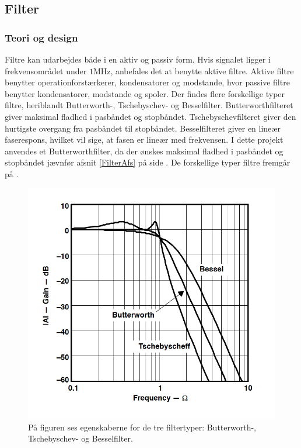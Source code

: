 \subsection{Filter}
\subsubsection{Teori og design}
Filtre kan udarbejdes både i en aktiv og passiv form. Hvis signalet ligger i frekvensområdet under $1$MHz, anbefales det at benytte aktive filtre. Aktive filtre benytter operationforstærkerer, kondensatorer og modstande, hvor passive filtre benytter kondensatorer, modstande og spoler. \cite{Carter2013} Der findes flere forskellige typer filtre, heriblandt Butterworth-, Tschebyschev- og Besselfilter. Butterworthfilteret giver maksimal fladhed i pasbåndet og stopbåndet. Tschebyschevfilteret giver den hurtigste overgang fra pasbåndet til stopbåndet. Besselfilteret giver en lineær faserespons, hvilket vil sige, at fasen er lineær med frekvensen. \cite{Carter2013} I dette projekt anvendes et Butterworthfilter, da der ønskes maksimal fladhed i pasbåndet og stopbåndet jævnfør afsnit \ref{FilterAfs} på side \pageref{FilterAfs}. De forskellige typer filtre fremgår på .
\begin{figure}[H]
	\centering
	\includegraphics[scale=0.7]{figures/cProblemloesning/type_filtre.PNG}
	\caption{På figuren ses egenskaberne for de tre filtertyper: Butterworth-, Tschebyschev- og Besselfilter. \cite{Carter2013}}
	\label{fig:type_filtre}
\end{figure}
